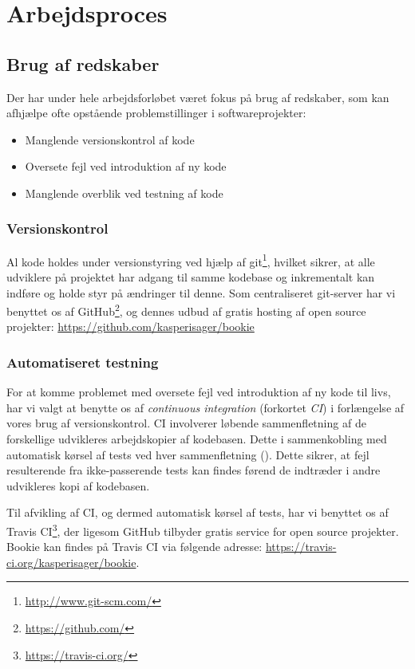 \chapter{Arbejdsproces}

\section{Brug af redskaber}

Der har under hele arbejdsforløbet været fokus på brug af redskaber, som kan afhjælpe ofte opstående problemstillinger i softwareprojekter:

\begin{itemize}
  \item Manglende versionskontrol af kode
  \item Oversete fejl ved introduktion af ny kode
  \item Manglende overblik ved testning af kode
\end{itemize}

\subsection{Versionskontrol}

Al kode holdes under versionstyring ved hjælp af git\footnote{\url{http://www.git-scm.com/}}, hvilket sikrer, at alle udviklere på projektet har adgang til samme kodebase og inkrementalt kan indføre og holde styr på ændringer til denne. Som centraliseret git-server har vi benyttet os af GitHub\footnote{\url{https://github.com/}}, og dennes udbud af gratis hosting af open source projekter: \url{https://github.com/kasperisager/bookie}

\subsection{Automatiseret testning}

For at komme problemet med oversete fejl ved introduktion af ny kode til livs, har vi valgt at benytte os af \textit{continuous integration} (forkortet \textit{CI}) i forlængelse af vores brug af versionskontrol. CI involverer løbende sammenfletning af de forskellige udvikleres arbejdskopier af kodebasen. Dette i sammenkobling med automatisk kørsel af tests ved hver sammenfletning (\cite{wiki:ci}). Dette sikrer, at fejl resulterende fra ikke-passerende tests kan findes førend de indtræder i andre udvikleres kopi af kodebasen.

Til afvikling af CI, og dermed automatisk kørsel af tests, har vi benyttet os af Travis CI\footnote{\url{https://travis-ci.org/}}, der ligesom GitHub tilbyder gratis service for open source projekter. Bookie kan findes på Travis CI via følgende adresse: \url{https://travis-ci.org/kasperisager/bookie}.

